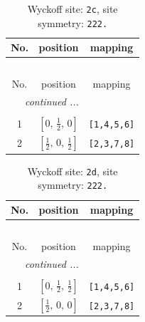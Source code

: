 \documentclass[fleqn,8pt]{jsarticle}
\begin{document}
\renewcommand{\arraystretch}{1.2}
\begin{longtable}{ccc}
\caption{Wyckoff site: {\tt 2c}, site symmetry: {\tt 222.}}
 \\
 \hline \hline
No. & position & mapping \\ \hline \endfirsthead

\multicolumn{2}{l}{\tablename\ \thetable{}} \\
 \hline \hline
No. & position & mapping \\ \hline \endhead

 \hline \hline
\multicolumn{2}{r}{\footnotesize\it continued ...} \\ \endfoot

 \hline \hline
\multicolumn{2}{r}{} \\ \endlastfoot

1 & $\left[ 0,\, \frac{1}{2},\, 0 \right]$ & {\tt [1,4,5,6]} \\ \hline
2 & $\left[ \frac{1}{2},\, 0,\, \frac{1}{2} \right]$ & {\tt [2,3,7,8]} \\
\end{longtable}
\renewcommand{\arraystretch}{1.2}
\begin{longtable}{ccc}
\caption{Wyckoff site: {\tt 2d}, site symmetry: {\tt 222.}}
 \\
 \hline \hline
No. & position & mapping \\ \hline \endfirsthead

\multicolumn{2}{l}{\tablename\ \thetable{}} \\
 \hline \hline
No. & position & mapping \\ \hline \endhead

 \hline \hline
\multicolumn{2}{r}{\footnotesize\it continued ...} \\ \endfoot

 \hline \hline
\multicolumn{2}{r}{} \\ \endlastfoot

1 & $\left[ 0,\, \frac{1}{2},\, \frac{1}{2} \right]$ & {\tt [1,4,5,6]} \\ \hline
2 & $\left[ \frac{1}{2},\, 0,\, 0 \right]$ & {\tt [2,3,7,8]} \\
\end{longtable}
\renewcommand{\arraystretch}{1.2}
\end{document}
